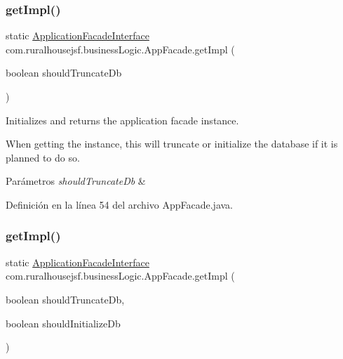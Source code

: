 \subsubsection{\texorpdfstring{getImpl()}{getImpl()}\hspace{0.1cm}{\footnotesize\ttfamily [2/3]}}
{\footnotesize\ttfamily static \mbox{\hyperlink{interfacecom_1_1ruralhousejsf_1_1business_logic_1_1_application_facade_interface}{Application\+Facade\+Interface}} com.\+ruralhousejsf.\+business\+Logic.\+App\+Facade.\+get\+Impl (\begin{DoxyParamCaption}\item[{boolean}]{should\+Truncate\+Db }\end{DoxyParamCaption})\hspace{0.3cm}{\ttfamily [static]}}

Initializes and returns the application facade instance. 

When getting the instance, this will truncate or initialize the database if it is planned to do so.


\begin{DoxyParams}{Parámetros}
{\em should\+Truncate\+Db} & \\
\hline
\end{DoxyParams}


Definición en la línea 54 del archivo App\+Facade.\+java.

\mbox{\label{classcom_1_1ruralhousejsf_1_1business_logic_1_1_app_facade_aab339d9b44293704c9214aef70c7c704}} 
\subsubsection{\texorpdfstring{getImpl()}{getImpl()}\hspace{0.1cm}{\footnotesize\ttfamily [3/3]}}
{\footnotesize\ttfamily static \mbox{\hyperlink{interfacecom_1_1ruralhousejsf_1_1business_logic_1_1_application_facade_interface}{Application\+Facade\+Interface}} com.\+ruralhousejsf.\+business\+Logic.\+App\+Facade.\+get\+Impl (\begin{DoxyParamCaption}\item[{boolean}]{should\+Truncate\+Db,  }\item[{boolean}]{should\+Initialize\+Db }\end{DoxyParamCaption})\hspace{0.3cm}{\ttfamily [static]}}

